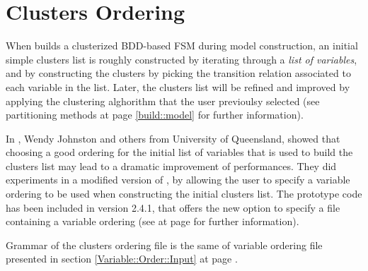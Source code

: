 \section{Clusters Ordering}
%
When \nusmv builds a clusterized BDD-based FSM during model
construction, an initial simple clusters list is roughly constructed
by iterating through a \emph{list of variables}, and by constructing
the clusters by picking the transition relation associated to each
variable in the list. Later, the clusters list will be refined and
improved by applying the clustering alghorithm that the user
previoulsy selected (see partitioning methods at page
\ref{build::model} for further information).


In \cite{fm06}, Wendy Johnston and others from University of
Queensland, showed that choosing a good ordering for the initial list
of variables that is used to build the clusters list may lead to a
dramatic improvement of performances. They did experiments in a
modified version of \nusmv, by allowing the user to specify a variable
ordering to be used when constructing the initial clusters list. The
prototype code has been included in version 2.4.1, that offers the new
option  to specify a file containing a
variable ordering (see at page \pageref{build::model} for further
information).


Grammar of the clusters ordering file is the same of variable ordering
file presented in section \ref{Variable::Order::Input} at page
\pageref{Variable::Order::Input}.

